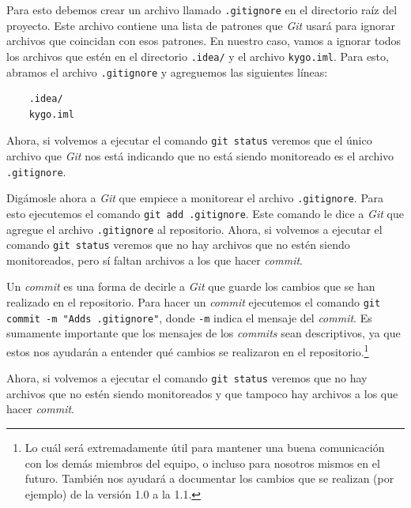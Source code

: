   Para esto debemos crear un archivo llamado \texttt{.gitignore} en el directorio 
  raíz del proyecto.
  Este archivo contiene una lista de patrones que \textit{Git} usará para ignorar archivos
  que coincidan con esos patrones.
  En nuestro caso, vamos a ignorar todos los archivos que estén en el directorio \texttt{.idea/} y
  el archivo \texttt{kygo.iml}.
  Para esto, abramos el archivo \texttt{.gitignore} y agreguemos las siguientes líneas:

  \begin{verbatim}
    .idea/
    kygo.iml
  \end{verbatim}

  Ahora, si volvemos a ejecutar el comando \texttt{git status} veremos que el único archivo que
  \textit{Git} nos está indicando que no está siendo monitoreado es el archivo \texttt{.gitignore}.

  Digámosle ahora a \textit{Git} que empiece a monitorear el archivo \texttt{.gitignore}.
  Para esto ejecutemos el comando \texttt{git add .gitignore}.
  Este comando le dice a \textit{Git} que agregue el archivo \texttt{.gitignore} al repositorio.
  Ahora, si volvemos a ejecutar el comando \texttt{git status} veremos que no hay archivos que
  no estén siendo monitoreados, pero sí faltan archivos a los que hacer \textit{commit}.

  Un \textit{commit} es una forma de decirle a \textit{Git} que guarde los cambios que se han
  realizado en el repositorio.
  Para hacer un \textit{commit} ejecutemos el comando 
  \texttt{git commit -m "Adds .gitignore"}, donde \texttt{-m} 
  indica el mensaje del \textit{commit}.
  Es sumamente importante que los mensajes de los \textit{commits} sean descriptivos, ya que
  estos nos ayudarán a entender qué cambios se realizaron en el repositorio.\footnote{
    Lo cuál será extremadamente útil para mantener una buena comunicación con los demás
    miembros del equipo, o incluso para nosotros mismos en el futuro.
    También nos ayudará a documentar los cambios que se realizan (por ejemplo) de la versión
    1.0 a la 1.1.
  }

  Ahora, si volvemos a ejecutar el comando \texttt{git status} veremos que no hay archivos que
  no estén siendo monitoreados y que tampoco hay archivos a los que hacer \textit{commit}.
